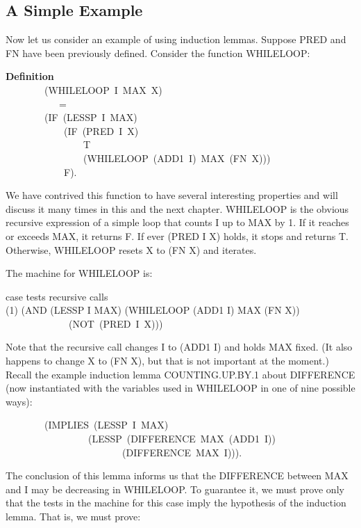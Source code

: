 \documentclass[10pt]{book}
\newenvironment{pubasis}{\begin{flushleft}}{\end{flushleft}}
\newcommand{\axiomordefinition}[1]{\vspace{6pt}\Large\textsf{\textbf{#1}}\normalsize}
\begin{document}
\subsection{A Simple Example}
Now let us consider an example of using induction
lemmas.  Suppose PRED and FN have been previously defined.
Consider the function WHILELOOP:
\begin{pubasis}
\axiomordefinition{Definition}\\
~~~~~~~~(WHILELOOP~I~MAX~X)\\
~~~~~~~~~~~=\\
~~~~~~~~(IF~(LESSP~I~MAX)\\
~~~~~~~~~~~~(IF~(PRED~I~X)\\
~~~~~~~~~~~~~~~~T\\
~~~~~~~~~~~~~~~~(WHILELOOP~(ADD1~I)~MAX~(FN~X)))\\
~~~~~~~~~~~~F).\\
\end{pubasis}
We have contrived this function to have several interesting properties
and will discuss it many times in this and the next chapter.
WHILELOOP is the obvious recursive expression
of a simple loop that counts I up to MAX by 1.  If it reaches or
exceeds MAX, it returns F.  If ever (PRED I X) holds, it stops and returns T.
Otherwise, WHILELOOP resets X to (FN X) and iterates.

The machine for WHILELOOP is:
\begin{pubasis}
case	   tests		recursive calls\\

(1)	(AND (LESSP I MAX)	(WHILELOOP (ADD1 I) MAX (FN X))\\
~~~~~~~~~~~~~(NOT~(PRED~I~X)))\\
\end{pubasis}
Note that the recursive call changes I to (ADD1 I) and holds MAX fixed.
(It also happens to change X to (FN X), but that is not important at the
moment.)  Recall the example induction lemma COUNTING.UP.BY.1 about DIFFERENCE
(now instantiated with the variables used in WHILELOOP in one of nine possible ways):
\begin{pubasis}
~~~~~~~~(IMPLIES~(LESSP~I~MAX)\\
~~~~~~~~~~~~~~~~~(LESSP~(DIFFERENCE~MAX~(ADD1~I))\\
~~~~~~~~~~~~~~~~~~~~~~~~(DIFFERENCE~MAX~I))).\\
\end{pubasis}
The conclusion of this lemma informs us that the DIFFERENCE between MAX and I may be
decreasing in WHILELOOP.  To guarantee it, we must  prove only that the tests
in the machine for this case imply the hypothesis of the induction
lemma.  That is, we must prove:
\end{document}
